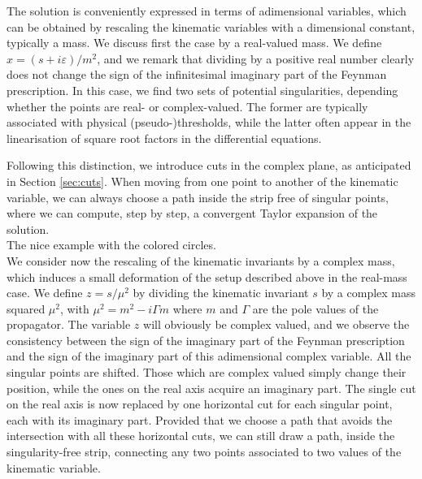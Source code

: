 The solution is conveniently expressed in terms of adimensional variables,
which can be obtained by rescaling the kinematic variables with a dimensional
constant, typically a mass.
We discuss first the case by a real-valued mass.
We define $x=(s+i\varepsilon)/m^2$,
and we remark that dividing by a positive real number clearly does not change
the sign of the infinitesimal imaginary part of the Feynman prescription.
In this case, we find two sets of potential singularities,
depending whether the points are real- or complex-valued.
The former are typically associated with physical (pseudo-)thresholds,
while the latter often appear in the linearisation
of square root factors in the differential equations.


Following this distinction,
we introduce cuts in the complex plane,
as anticipated in Section \ref{sec:cuts}.
When moving from one point to another of the kinematic variable,
we can always choose a path inside the strip free of singular points,
where we can compute,
step by step, a convergent Taylor expansion of the solution.\\

The nice example with the colored circles.\\

We consider now the rescaling of the kinematic invariants by a complex mass,
which induces a small deformation of the setup described above
in the real-mass case.
We define $z=s/\mu^2$
by dividing the kinematic invariant $s$ by a complex mass squared $\mu^2$,
with $\mu^2=m^2-i\Gamma m$
where $m$ and $\Gamma$ are the pole values of the propagator.
The variable $z$ will obviously be complex valued,
and we observe the consistency between
the sign of the imaginary part of the Feynman prescription
and the sign of the imaginary part of this adimensional complex variable.
All the singular points are shifted.
Those which are complex valued simply change their position, while
the ones on the real axis acquire an imaginary part.
The single cut on the real axis is now replaced by one horizontal cut for each
singular point, each with its imaginary part.
Provided that we choose a path that avoids the intersection with all these
horizontal cuts, we can still draw a path,
inside the singularity-free strip,
connecting any two points associated to two values of the kinematic variable.\\

